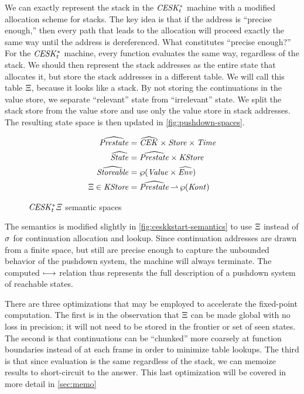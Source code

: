We can exactly represent the stack in the $\mathit{CESK^*_t}$ machine with a modified allocation scheme for stacks.
%
The key idea is that if the address is ``precise enough,'' then every path that leads to the allocation will proceed exactly the same way until the address is dereferenced.
%
What constitutes ``precise enough?'' 
%
For the $\mathit{CESK^*_t}$ machine, every function evaluates the same way, regardless of the stack.
%
We should then represent the stack addresses as the entire state that allocates it, but store the stack addresses in a different table.
%
We will call this table $\Xi$, because it looks like a stack.
%
By not storing the continuations in the value store, we separate ``relevant'' state from ``irrelevant'' state.
%
We split the stack store from the value store and use only the value store in stack addresses.
%
The resulting state space is then updated in \autoref{fig:pushdown-spaces}.

\begin{figure}
  \centering
  \begin{align*}
    \widehat{\mathit{Prestate}} &= \widehat{\mathit{CEK}} \times \mathit{Store} \times \mathit{Time} \\
    \widehat{\mathit{State}} &= \widehat{\mathit{Prestate}} \times \mathit{KStore} \\
    \widehat{\mathit{Storeable}} &= \wp(\mathit{Value} \times \widehat{\mathit{Env}}) \\
    \Xi \in \mathit{KStore} &= \widehat{\mathit{Prestate}} \operatorname*{\rightharpoonup} \wp(\mathit{Kont})
  \end{align*}
  \caption{$\mathit{CESK^*_t\Xi}$ semantic spaces}
  \label{fig:pushdown-spaces}
\end{figure}

The semantics is modified slightly in \autoref{fig:ceskkstart-semantics} to use $\Xi$ instead of $\sigma$ for continuation allocation and lookup.
%
Since continuation addresses are drawn from a finite space, but still are precise enough to capture the unbounded behavior of the pushdown system, the machine will always terminate.
%
The computed $\longmapsto$ relation thus represents the full description of a pushdown system of reachable states.
\begin{theorem}[Correctness]
\end{theorem}

There are three optimizations that may be employed to accelerate the fixed-point computation.
%
The first is in the observation that $\Xi$ can be made global with no loss in precision; it will not need to be stored in the frontier or set of seen states.
%
The second is that continuations can be ``chunked'' more coarsely at function boundaries instead of at each frame in order to minimize table lookups.
%
The third is that since evaluation is the same regardless of the stack, we can memoize results to short-circuit to the answer.
%
This last optimization will be covered in more detail in \autoref{sec:memo}

